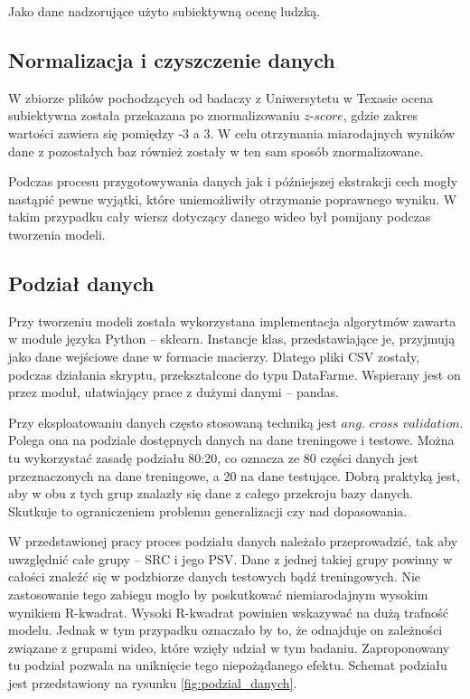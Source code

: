 Jako dane nadzorujące użyto subiektywną ocenę ludzką.\par

\subsection{Normalizacja i czyszczenie danych}
W zbiorze plików pochodzących od badaczy z Uniwersytetu w Texasie ocena subiektywna została przekazana po znormalizowaniu $z$-$score$, gdzie zakres wartości zawiera się pomiędzy -3 a 3. W celu otrzymania miarodajnych wyników dane z pozostałych baz również zostały w ten sam sposób znormalizowane.\par
Podczas procesu przygotowywania danych jak i późniejszej ekstrakcji cech mogły nastąpić pewne wyjątki, które uniemożliwiły otrzymanie poprawnego wyniku. W takim przypadku cały wiersz dotyczący danego wideo był pomijany podczas tworzenia modeli.

\subsection{Podział danych}

Przy tworzeniu modeli została wykorzystana implementacja algorytmów zawarta w module języka Python -- sklearn. Instancje klas, przedstawiające je, przyjmują jako dane wejściowe dane w formacie macierzy. Dlatego pliki CSV zostały, podczas działania skryptu, przekształcone do typu DataFarme. Wspierany jest on przez moduł, ułatwiający prace z dużymi danymi -- pandas.\par

Przy eksploatowaniu danych często stosowaną techniką jest $ang.$ $cross$ $validation$. Polega ona na podziale dostępnych danych na dane treningowe i testowe. Można tu wykorzystać zasadę podziału 80:20, co oznacza ze 80 części danych jest przeznaczonych na dane treningowe, a 20 na dane testujące. Dobrą praktyką jest, aby w obu z tych grup znalazły się dane z całego przekroju bazy danych. Skutkuje to ograniczeniem problemu generalizacji czy nad dopasowania. 

W przedstawionej pracy proces podziału danych należało przeprowadzić, tak aby uwzględnić  całe grupy --  SRC i jego PSV. Dane z jednej takiej grupy powinny w całości znaleźć się w podzbiorze danych testowych bądź treningowych. Nie zastosowanie tego zabiegu mogło by poskutkować niemiarodajnym wysokim wynikiem R-kwadrat. Wysoki R-kwadrat powinien wskazywać na dużą trafność modelu. Jednak w tym przypadku oznaczało by to, że odnajduje on zależności związane z grupami wideo, które wzięły udział w tym badaniu. Zaproponowany tu podział pozwala na uniknięcie tego niepożądanego efektu. Schemat podziału jest przedstawiony na rysunku \ref{fig:podzial_danych}.

